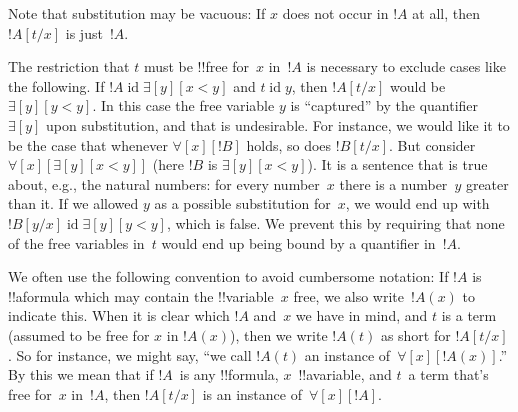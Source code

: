 \documentclass[10pt,a4paper]{article}
\theoremstyle{plain}
\theoremstyle{definition}
\theoremstyle{remark}
\newenvironment{explain}{}{}
\newcommand*{\olchapter}[3]{}
\newcommand*{\olimport}[1]{}
\providecommand{\lforall}{\mathord{\forall}}
\providecommand{\lexists}{\mathord{\exists}}
\providecommand{\Subst}[3]{#1[#2/#3]}
\providecommand{\ident}{\operatorname{id}}
\begin{document}
\begin{explain}
Note that substitution may be vacuous: If $x$ does not occur in $!A$
at all, then $\Subst{!A}{t}{x}$ is just~$!A$.

The restriction that $t$ must be !!{free for}~$x$ in~$!A$ is necessary to
exclude cases like the following. If $!A \ident \lexists[y][x < y]$
and $t \ident y$, then $\Subst{!A}{t}{x}$ would be $\lexists[y][y <
  y]$. In this case the free variable $y$ is ``captured'' by the
quantifier $\lexists[y]$ upon substitution, and that is undesirable.
For instance, we would like it to be the case that whenever
$\lforall[x][!B]$ holds, so does $\Subst{!B}{t}{x}$. But consider
$\lforall[x][\lexists[y][x < y]]$ (here $!B$ is $\lexists[y][x <
  y]$). It is a sentence that is true about, e.g., the natural numbers:
for every number~$x$ there is a number~$y$ greater than it. If we
allowed $y$ as a possible substitution for~$x$, we would end up with
$\Subst{!B}{y}{x} \ident \lexists[y][y < y]$, which is false. We
prevent this by requiring that none of the free variables in~$t$ would
end up being bound by a quantifier in~$!A$.
\end{explain}

We often use the following convention to avoid cumbersome notation: If
$!A$ is !!a{formula} which may contain the !!{variable}~$x$ free, we
also write~$!A(x)$ to indicate this. When it is clear which $!A$
and~$x$ we have in mind, and $t$ is a term (assumed to be free for $x$
in $!A(x)$), then we write $!A(t)$ as short for $\Subst{!A}{t}{x}$. So
for instance, we might say, ``we call $!A(t)$ an instance
of~$\lforall[x][!A(x)]$.'' By this we mean that if $!A$~is any
!!{formula}, $x$~!!a{variable}, and $t$~a term that's free for~$x$
in~$!A$, then $\Subst{!A}{t}{x}$ is an instance of~$\lforall[x][!A]$.





\olchapter{fol}{syn}{Syntax and Semantics}

\olimport{introduction}

\olimport{first-order-languages}

\olimport{terms-formulas}

\olimport{unique-readability}

\olimport{main-operator}

\olimport{subformulas}
\end{document}
